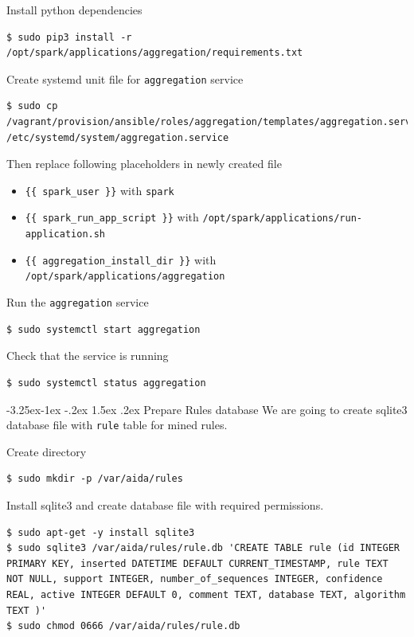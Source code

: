 \documentclass[a4paper]{article} %
\makeatletter
\renewcommand{\normalsize}{\fontsize{12}{15}\selectfont\color{textcolor}}
\renewcommand\subsubsection{\@startsection{subsubsection}{3}{\z@}%
                   {-3.25ex\@plus -1ex \@minus -.2ex}%
                   {1.5ex \@plus .2ex}%
                   {\normalfont\sffamily\normalsize\bfseries\color{projectcolor}}}
\makeatother
\begin{document}
Install python dependencies
\begin{lstlisting}
$ sudo pip3 install -r /opt/spark/applications/aggregation/requirements.txt
\end{lstlisting}

Create systemd unit file for \texttt{aggregation} service
\begin{lstlisting}
$ sudo cp /vagrant/provision/ansible/roles/aggregation/templates/aggregation.service.j2 /etc/systemd/system/aggregation.service
\end{lstlisting}

Then replace following placeholders in newly created file
\begin{itemize}[noitemsep,nolistsep]
\item \texttt{\{\{ spark\_user \}\}} with \texttt{spark}
\item \texttt{\{\{ spark\_run\_app\_script \}\}} with \texttt{/opt/spark/applications/run-application.sh}
\item \texttt{\{\{ aggregation\_install\_dir \}\}} with \texttt{/opt/spark/applications/aggregation}
\end{itemize}

Run the \texttt{aggregation} service
\begin{lstlisting}
$ sudo systemctl start aggregation
\end{lstlisting}

Check that the service is running
\begin{lstlisting}
$ sudo systemctl status aggregation
\end{lstlisting}


\subsubsection{Prepare Rules database}
We are going to create sqlite3 database file with \texttt{rule} table for mined rules.

Create directory
\begin{lstlisting}
$ sudo mkdir -p /var/aida/rules
\end{lstlisting}

Install sqlite3 and create database file with required permissions.
\begin{lstlisting}
$ sudo apt-get -y install sqlite3
$ sudo sqlite3 /var/aida/rules/rule.db 'CREATE TABLE rule (id INTEGER PRIMARY KEY, inserted DATETIME DEFAULT CURRENT_TIMESTAMP, rule TEXT NOT NULL, support INTEGER, number_of_sequences INTEGER, confidence REAL, active INTEGER DEFAULT 0, comment TEXT, database TEXT, algorithm TEXT )'
$ sudo chmod 0666 /var/aida/rules/rule.db
\end{lstlisting}
\end{document}
